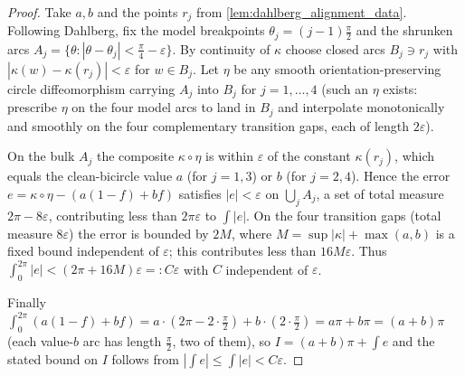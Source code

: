 \begin{proof}
  \leanok
  Take $a,b$ and the points $r_j$ from \cref{lem:dahlberg_alignment_data}.
  Following Dahlberg, fix the model breakpoints $\theta_j=(j-1)\tfrac{\pi}{2}$ and
  the shrunken arcs $A_j=\{\theta:|\theta-\theta_j|<\tfrac{\pi}{4}-\varepsilon\}$.
  By continuity of $\kappa$ choose closed arcs $B_j\ni r_j$ with
  $|\kappa(w)-\kappa(r_j)|<\varepsilon$ for $w\in B_j$. Let $\eta$ be any smooth
  orientation-preserving circle diffeomorphism carrying $A_j$ into $B_j$ for
  $j=1,\dots,4$ (such an $\eta$ exists: prescribe $\eta$ on the four model arcs to
  land in $B_j$ and interpolate monotonically and smoothly on the four
  complementary transition gaps, each of length $2\varepsilon$).

  On the bulk $A_j$ the composite $\kappa\circ\eta$ is within $\varepsilon$ of the
  constant $\kappa(r_j)$, which equals the clean-bicircle value $a$ (for
  $j=1,3$) or $b$ (for $j=2,4$). Hence the error $e=\kappa\circ\eta-(a(1-f)+bf)$
  satisfies $|e|<\varepsilon$ on $\bigcup_j A_j$, a set of total measure
  $2\pi-8\varepsilon$, contributing less than $2\pi\varepsilon$ to
  $\int|e|$. On the four transition gaps (total measure $8\varepsilon$) the error
  is bounded by $2M$, where $M=\sup|\kappa|+\max(a,b)$ is a fixed bound
  independent of $\varepsilon$; this contributes less than $16M\varepsilon$. Thus
  $\int_0^{2\pi}|e|<(2\pi+16M)\varepsilon=:C\varepsilon$ with $C$ independent of
  $\varepsilon$.

  Finally $\int_0^{2\pi}(a(1-f)+bf)=a\cdot(2\pi-2\cdot\tfrac{\pi}{2})+b\cdot(2\cdot\tfrac{\pi}{2})
  =a\pi+b\pi=(a+b)\pi$ (each value-$b$ arc has length $\tfrac{\pi}{2}$, two of
  them), so $I=(a+b)\pi+\int e$ and the stated bound on $I$ follows from
  $|\int e|\le\int|e|<C\varepsilon$.
\end{proof}

